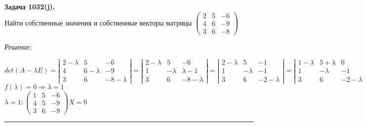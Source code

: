 \documentclass[a4paper, 12pt]{article}
\newenvironment{problem}[2][Задача]
    { \begin{mdframed}[backgroundcolor=gray!10] \textbf{#1 #2.} \\}
    {  \end{mdframed}}
\newenvironment{solution}
    {\textit{Решение: }}
    {\noindent\rule{7in}{1.5pt}}
\begin{document}
\begin{problem}{1032(j)}
Найти собственные значения и собственные векторы матрицы
$\left(\begin{array}{rrr}2 & 5 & -6 \\ 4 & 6 & -9 \\ 3 & 6 & -8 \end{array}\right)$

\end{problem}
\begin{solution}

  $
det(A-\lambda E) = \left|\begin{array}{rrr}2-\lambda & 5 & -6 \\ 4 & 6-\lambda & -9 \\ 3 & 6 & -8-\lambda \end{array}\right| = \left|\begin{array}{rrr}2-\lambda & 5 & -6 \\ 1 & -\lambda & \lambda-1 \\ 3 & 6 & -8-\lambda \end{array}\right| = \left|\begin{array}{rrr}2-\lambda & 5 & -1 \\ 1 & -\lambda & -1 \\ 3 & 6 & -2-\lambda \end{array}\right| = \left|\begin{array}{rrr}1-\lambda & 5+\lambda & 0 \\ 1 & -\lambda & -1 \\ 3 & 6 & -2-\lambda \end{array}\right| = (1-\lambda)\left|\begin{array}{rr}-\lambda & -1 \\ 6 & -2-\lambda \end{array}\right| - (5+\lambda)\left|\begin{array}{rr}1 & -1 \\ 3 & -2-\lambda \end{array}\right| = (1-\lambda)(\lambda^2+2\lambda+6)-(5+\lambda)(-2-\lambda+3)=1-\lambda^3
$
\\
$\displaystyle
f(\lambda) = 0 \Rightarrow \lambda = 1$
\\
$\displaystyle
\lambda = 1: \left(\begin{array}{rrr}1 & 5 & -6 \\ 4 & 5 & -9 \\ 3 & 6 & -9 \end{array}\right)X=0$

\end{solution}
\end{document}
